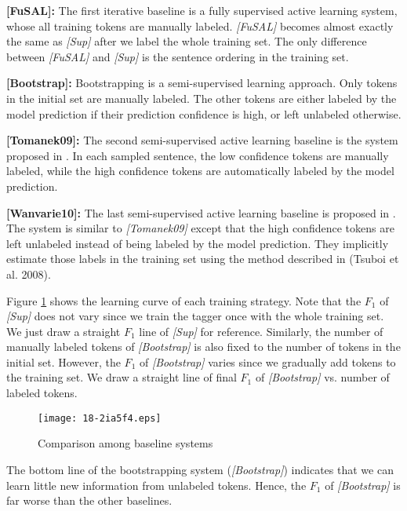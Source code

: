 \documentclass[english]{jnlp_JS2.0}
\begin{document}
\textbf{[FuSAL]:} The first iterative baseline is a fully supervised active learning system, whose all training tokens are manually labeled. \textit{[FuSAL]} becomes almost exactly the same as \textit{[Sup]} after we label the whole training set. The only difference between \textit{[FuSAL]} and \textit{[Sup]} is the sentence ordering in the training set.

\textbf{[Bootstrap]:} Bootstrapping is a semi-supervised learning approach. Only tokens in the initial set are manually labeled. The other tokens are either labeled by the model prediction if their prediction confidence is high, or left unlabeled otherwise.

\textbf{[Tomanek09]:} The second semi-supervised active learning baseline is the system proposed in  \cite{Tomanek2009}. In each sampled sentence, the low confidence tokens are manually labeled, while the high confidence tokens are automatically labeled by the model prediction.

\textbf{[Wanvarie10]:} The last semi-supervised active learning baseline is proposed in \cite{DittayaNLKEN}. The system is similar to \textit{[Tomanek09]} except that the high confidence tokens are left unlabeled instead of being labeled by the model prediction. They implicitly estimate those labels in the training set using the method described in (Tsuboi et al. 2008).

Figure \ref{Fig:Baselines} shows the learning curve of each training strategy. Note that the $F_1$ of \textit{[Sup]} does not vary since we train the tagger once with the whole training set. We just draw a straight $F_1$ line of \textit{[Sup]} for reference. Similarly, the number of manually labeled tokens of \textit{[Bootstrap]} is also fixed to the number of tokens in the initial set. However, the $F_1$ of \textit{[Bootstrap]} varies since we gradually add tokens to the training set. We draw a straight line of final $F_1$ of \textit{[Bootstrap]} vs. number of labeled tokens.

\begin{figure}[b]
\begin{center}
\texttt{[image: 18-2ia5f4.eps]}
\end{center}
\caption{Comparison among baseline systems}
\label{Fig:Baselines}
\end{figure}

The bottom line of the bootstrapping system (\textit{[Bootstrap]}) indicates that we can learn little new information from unlabeled tokens. Hence, the $F_1$ of \textit{[Bootstrap]} is far worse than the other baselines.
\end{document}
